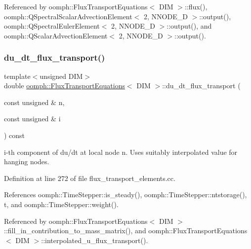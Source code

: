 Referenced by oomph\+::\+Flux\+Transport\+Equations$<$ D\+I\+M $>$\+::flux(), oomph\+::\+Q\+Spectral\+Scalar\+Advection\+Element$<$ 2, N\+N\+O\+D\+E\+\_\+D $>$\+::output(), oomph\+::\+Q\+Spectral\+Euler\+Element$<$ 2, N\+N\+O\+D\+E\+\_\+D $>$\+::output(), and oomph\+::\+Q\+Scalar\+Advection\+Element$<$ 2, N\+N\+O\+D\+E\+\_\+D $>$\+::output().

\mbox{\label{classoomph_1_1FluxTransportEquations_ab637781b0f2fe83c5bc8f8127af4e1d4}} 
\subsubsection{\texorpdfstring{du\+\_\+dt\+\_\+flux\+\_\+transport()}{du\_dt\_flux\_transport()}}
{\footnotesize\ttfamily template$<$unsigned D\+IM$>$ \\
double \hyperlink{classoomph_1_1FluxTransportEquations}{oomph\+::\+Flux\+Transport\+Equations}$<$ D\+IM $>$\+::du\+\_\+dt\+\_\+flux\+\_\+transport (\begin{DoxyParamCaption}\item[{const unsigned \&}]{n,  }\item[{const unsigned \&}]{i }\end{DoxyParamCaption}) const}



i-\/th component of du/dt at local node n. Uses suitably interpolated value for hanging nodes. 



Definition at line 272 of file flux\+\_\+transport\+\_\+elements.\+cc.



References oomph\+::\+Time\+Stepper\+::is\+\_\+steady(), oomph\+::\+Time\+Stepper\+::ntstorage(), t, and oomph\+::\+Time\+Stepper\+::weight().



Referenced by oomph\+::\+Flux\+Transport\+Equations$<$ D\+I\+M $>$\+::fill\+\_\+in\+\_\+contribution\+\_\+to\+\_\+mass\+\_\+matrix(), and oomph\+::\+Flux\+Transport\+Equations$<$ D\+I\+M $>$\+::interpolated\+\_\+u\+\_\+flux\+\_\+transport().

\mbox{\label{classoomph_1_1FluxTransportEquations_a8557a64caa8d9e0b4a152664718d26ab}} 
